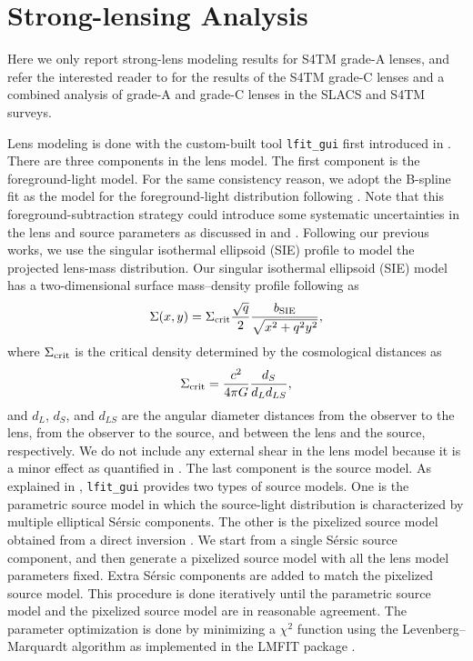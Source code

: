 \documentclass{emulateapj}
\begin{document}
\section{Strong-lensing Analysis}
\label{sect:models}

Here we only report strong-lens modeling results for S4TM grade-A lenses, and refer the 
interested reader to \citet{Shu15} for the results of the S4TM grade-C lenses and a combined 
analysis of grade-A and grade-C lenses in the SLACS and S4TM surveys. 

Lens modeling is done with the custom-built tool {\tt lfit\_gui} first introduced in 
\citet{BELLS_IV}. There are three components in the lens model. 
The first component is the foreground-light model. 
For the same consistency reason, we adopt the B-spline fit as the model for the foreground-light 
distribution following \citet{Shu15}. Note that this foreground-subtraction strategy could 
introduce some systematic uncertainties in the lens and source parameters as discussed in 
\citet{Marshall07} and \citet{Shu16a, BELLS_IV}. Following our previous works, 
we use the singular isothermal ellipsoid (SIE) profile to model the projected lens-mass 
distribution. Our singular isothermal ellipsoid (SIE) model has a two-dimensional surface 
mass--density profile following \citet{Kormann94} as 
\begin{equation}
\Sigma (x, y) = \Sigma_{\rm crit} \frac{\sqrt{q}}{2} \frac{b_{\rm SIE}}{\sqrt{x^2+q^2 y^2}},
\end{equation}
where $\Sigma_{\rm crit}$ is the critical density determined by the cosmological 
distances as 
\begin{equation}
\Sigma_{\rm crit} = \frac{c^2}{4 \pi G} \frac{d_{S}}{d_{L} d_{LS}}, 
\end{equation}
and $d_{L}$, $d_{S}$, and $d_{LS}$ are the angular diameter distances 
from the observer to the lens, from the observer to the source, 
and between the lens and the source, respectively. 
We do not include any external shear in the lens model because it is a minor 
effect as quantified in \citet{Shu15}. 
The last component is the source model. As explained in \citet{BELLS_IV}, {\tt lfit\_gui} 
provides two types of source models. One is the parametric source model in which the 
source-light distribution is characterized by multiple elliptical S\'{e}rsic components. 
The other is the pixelized source model obtained from a direct inversion 
\citep[e.g.,][]{Dye05, Koopmans05, Brewer06, Suyu06, Vegetti09, Nightingale15}. We start from 
a single S\'{e}rsic source component, and then generate a pixelized source model with 
all the lens model parameters fixed. Extra S\'{e}rsic components are added to match the 
pixelized source model. This procedure is done iteratively until the parametric source model 
and the pixelized source model are in reasonable agreement. 
The parameter optimization is done by minimizing a $\chi^2$ function using the 
Levenberg--Marquardt algorithm as implemented in the LMFIT package \citep{lmfit}. 
\end{document}
